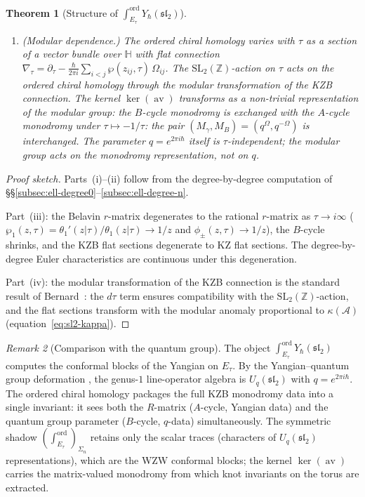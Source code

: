 \documentclass[11pt,reqno]{amsart}
\newtheorem{theorem}{Theorem}[section]
\theoremstyle{definition}
\theoremstyle{remark}
\newtheorem{remark}[theorem]{Remark}
\newcommand{\cA}{\mathcal{A}}
\DeclareMathOperator{\av}{av}
\newcommand{\ZZ}{\mathbb{Z}}
\newcommand{\HHH}{\mathbb{H}}
\numberwithin{equation}{section}
\begin{document}
\begin{theorem}[Structure of
$\int_{E_\tau}^{\mathrm{ord}}
Y_\hbar(\mathfrak{sl}_2)$]
\begin{enumerate}[label=\textup{(\roman*)}]
\item \textup{(Modular dependence.)}
  The ordered chiral homology varies with $\tau$ as a section
  of a vector bundle over $\HHH$ with flat connection
  $\nabla_\tau = \partial_\tau - \frac{\hbar}{2\pi i}
  \sum_{i<j} \wp(z_{ij}, \tau)\,\Omega_{ij}$.
  The $\mathrm{SL}_2(\ZZ)$-action on $\tau$ acts on the
  ordered chiral homology through the modular transformation
  of the KZB connection. The kernel $\ker(\av)$ transforms as
  a non-trivial representation of the modular group: the
  $B$-cycle monodromy is exchanged with the $A$-cycle
  monodromy under $\tau \mapsto -1/\tau$: the pair
  $(M_\gamma, M_B) = (q^\Omega, q^{-\Omega})$ is interchanged.
  The parameter $q = e^{2\pi i \hbar}$ itself is
  $\tau$-independent; the modular group acts on the
  monodromy representation, not on $q$.
\end{enumerate}
\end{theorem}

\begin{proof}[Proof sketch]
Parts~(i)--(ii) follow from the degree-by-degree computation
of \S\S\ref{subsec:ell-degree0}--\ref{subsec:ell-degree-n}.

Part~(iii): the Belavin $r$-matrix degenerates to the
rational $r$-matrix as $\tau \to i\infty$
($\wp_1(z, \tau) = \theta_1'(z|\tau)/\theta_1(z|\tau)
\to 1/z$ and $\phi_\pm(z, \tau) \to 1/z$), the $B$-cycle shrinks,
and the KZB flat sections degenerate to KZ flat sections.
The degree-by-degree Euler characteristics are continuous under
this degeneration.

Part~(iv): the modular transformation of the KZB connection is
the standard result of Bernard~\cite{Bernard88}: the $d\tau$
term ensures compatibility with the $\mathrm{SL}_2(\ZZ)$-action,
and the flat sections transform with the modular anomaly
proportional to $\kappa(\cA)$ (equation~\eqref{eq:sl2-kappa}).
\end{proof}

\begin{remark}[Comparison with the quantum group]
\label{rem:ell-quantum-group}
The object
$\int_{E_\tau}^{\mathrm{ord}} Y_\hbar(\mathfrak{sl}_2)$
computes the conformal blocks of the Yangian on $E_\tau$.
By the Yangian--quantum group deformation
\cite[Theorem~5.5.1]{Lorgat26I},
the genus-$1$ line-operator algebra is
$U_q(\mathfrak{sl}_2)$ with $q = e^{2\pi i \hbar}$.
The ordered chiral homology packages the full KZB monodromy
data into a single invariant: it sees both the $R$-matrix
($A$-cycle, Yangian data) and the quantum group parameter
($B$-cycle, $q$-data) simultaneously. The symmetric shadow
$(\int_{E_\tau}^{\mathrm{ord}})_{\Sigma_n}$ retains only
the scalar traces (characters of $U_q(\mathfrak{sl}_2)$
representations), which are the WZW conformal blocks; the
kernel $\ker(\av)$ carries the matrix-valued monodromy from
which knot invariants on the torus are extracted.
\end{remark}
\end{document}
